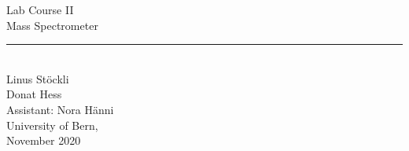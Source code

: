 \begin{center}
    \vspace*{\fill} %
    \LARGE{Lab Course II} \\
    \vspace{5mm}
    \Huge{Mass Spectrometer} \\
    \rule{10cm}{1pt} \\
    \vspace{2cm}
    \Large{Linus Stöckli \\Donat Hess} \\
    \vspace{1cm}
    \Large{Assistant: Nora Hänni} \\
    \vspace{1cm}
    \Large{University of Bern, \\ November 2020}
    \vspace*{\fill} %
\end{center}